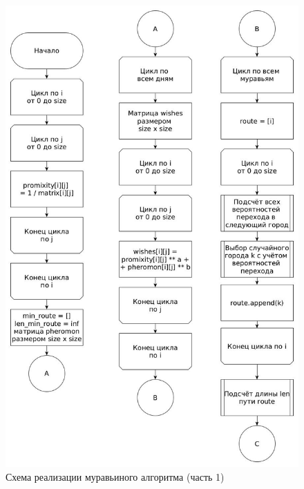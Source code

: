 \FloatBarrier
\begin{figure}[hp]
	\begin{center}
		\includegraphics[width=\linewidth]{graph/ant.jpg}
	\end{center}
	\caption{Схема реализации муравьиного алгоритма (часть 1)}
\end{figure}
\FloatBarrier


